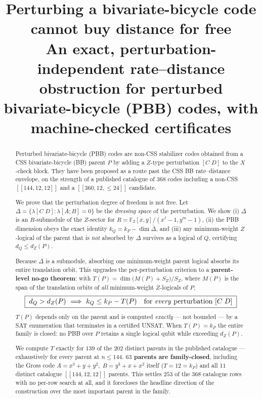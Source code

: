 \documentclass[11pt]{article}
\title{Perturbing a bivariate-bicycle code cannot buy distance for free\\[0.6em]
  \large An exact, perturbation-independent rate--distance obstruction for
  perturbed bivariate-bicycle (PBB) codes, with machine-checked certificates}
\author{}
\date{}
\newcommand{\nk}[1]{[\![#1]\!]}
\theoremstyle{plain}
\theoremstyle{remark}
\begin{document}
\maketitle

\begin{abstract}
Perturbed bivariate-bicycle (PBB) codes are non-CSS stabilizer codes obtained from a CSS
bivariate-bicycle (BB) parent $P$ by adding a $Z$-type perturbation $[C\;D]$ to the
$X$-check block. They have been proposed as a route past the CSS BB rate--distance
envelope, on the strength of a published catalogue of $368$ codes including a non-CSS
$\nk{144,12,12}$ and a $\nk{360,12,\le 24}$ candidate.

We prove that the perturbation degree of freedom is not free. Let
$\Delta=\{\lambda[C\;D] : \lambda[A;B]=0\}$ be the \emph{dressing space} of the perturbation.
We show (i) $\Delta$ is an $R$-submodule of the $Z$-sector for
$R=\mathbb{F}_2[x,y]/(x^{\ell}-1,y^{m}-1)$, (ii) the PBB dimension obeys the exact
identity $k_Q = k_P - \dim\bar\Delta$, and (iii) any minimum-weight $Z$-logical of the
parent that is \emph{not} absorbed by $\Delta$ survives as a logical of $Q$, certifying
$d_Q \le d_Z(P)$.

Because $\Delta$ is a submodule, absorbing one minimum-weight parent logical absorbs its
entire translation orbit. This upgrades the per-perturbation criterion to a
\textbf{parent-level no-go theorem}: with
$T(P)=\dim\big(M(P)+S_Z\big)/S_Z$, where $M(P)$ is the span of the translation orbits of
\emph{all} minimum-weight $Z$-logicals of $P$,
\[
\boxed{\;d_Q > d_Z(P)\ \Longrightarrow\ k_Q \le k_P - T(P)\quad\text{for \emph{every} perturbation } [C\;D]\;}
\]
$T(P)$ depends only on the parent and is computed \emph{exactly} --- not bounded --- by a SAT
enumeration that terminates in a certified UNSAT. When $T(P)=k_P$ the entire family is
closed: no PBB over $P$ retains a single logical qubit while exceeding $d_Z(P)$.

We compute $T$ exactly for $139$ of the $202$ distinct parents in the published
catalogue --- exhaustively for every parent at $n\le 144$. \textbf{$63$ parents are family-closed}, including the Gross code
$A=x^3+y+y^2,\;B=y^3+x+x^2$ itself ($T=12=k_P$) and all $11$ distinct catalogue
$\nk{144,12,12}$ parents. This settles $253$ of the $368$ catalogue rows with no per-row
search at all, and it forecloses the headline direction of the construction over the
most important parent in the family.


\end{abstract}
\end{document}
